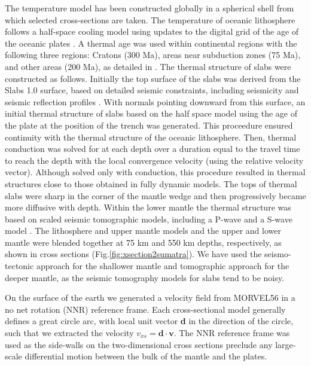 \documentclass[12pt]{article}
\begin{document}
{The temperature model has been constructed globally in a spherical shell from which selected cross-sections are taken. The temperature of oceanic lithosphere follows a half-space cooling model using  updates to the digital grid of the age of the oceanic plates \citep{muller1997digital}.  
A thermal age was used within continental regions with the following three regions: Cratons (300 Ma), areas near subduction zones (75 Ma), and other areas (200 Ma), as detailed in \citep{Stadler27082010}.
The thermal structure of slabs were constructed as follows. 
Initially the top surface of the slabs was derived from the Slabs 1.0 surface, based on detailed seismic constraints, including seismicity and seismic reflection profiles \citep{Hayes2012}.
With normals pointing downward from this surface, an initial thermal structure of slabs based on the half space model using the age of the plate at the position of the trench was generated. This proceedure ensured continuity with the thermal structure of the oceanic lithosphere. Then, thermal conduction was solved for at each depth over a duration equal to the travel time to reach the depth with the local convergence velocity (using the relative velocity vector). Although solved only with conduction, this procedure resulted in thermal structures close to those obtained in fully dynamic models. The tops of thermal  slabs were sharp in the corner of the mantle wedge and then progressively became more diffusive with depth.
Within the lower mantle the thermal structure was based on scaled seismic tomographic models,
including a P-wave \citep{simmons2012llnl} and a S-wave model \citep{ritsema1999complex}.
The lithosphere and upper mantle models and the upper and lower mantle were blended together at 75 km and 550 km depths, respectively, as shown in cross sections (Fig.\ref{fig:xsection2sumatra}).
We have used the seismo-tectonic approach for the shallower mantle and tomographic approach for the deeper mantle, as the seismic tomography models for slabs tend to be noisy.


On the surface of the earth we generated a velocity field from MORVEL56 \citep{GGGE2060} in a no net rotation (NNR) reference frame. Each cross-sectional model generally defines a great circle arc, with local unit vector \textbf{d} in the direction of the circle, such that we extracted the velocity $v_{xs}=\textbf{d}\cdot\textbf{v}$.  The NNR reference frame was used as the side-walls on the two-dimensional cross sections preclude any large-scale differential motion between the bulk of the mantle and the plates.






}
\end{document}
